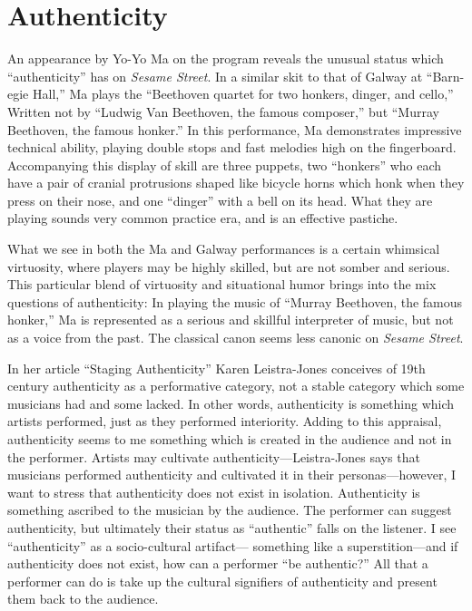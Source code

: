 \documentclass[12pt,letterpaper]{article}
\begin{document}
	\section*{Authenticity}

	An appearance by Yo-Yo Ma on the program reveals the unusual status 
	which ``authenticity'' has on \textit{Sesame Street}. In a similar 
	skit to that of Galway at ``Barn-egie Hall,'' Ma plays the 
	``Beethoven quartet for two honkers, dinger, and cello,'' Written not 
	by ``Ludwig Van Beethoven, the famous composer,'' but ``Murray 
	Beethoven, the famous honker.''\autocite{MaHonkers} In this performance,
	Ma demonstrates impressive technical ability, playing double stops and 
	fast melodies high on the fingerboard. Accompanying this display of 
	skill are three puppets, two ``honkers'' who each have a pair of cranial
	protrusions shaped like bicycle horns which honk when they press on 
	their nose, and one ``dinger'' with a bell on its head. What they are 
	playing sounds very common practice era, and is an effective pastiche.

        What we see in both the Ma and Galway performances is a certain 
	whimsical virtuosity, where players may be highly skilled, but are not
	somber and serious. This particular blend of virtuosity and situational
	humor brings into the mix questions of authenticity: In playing the
	music of ``Murray Beethoven, the famous honker,'' Ma is represented as a
	serious and skillful interpreter of music, but not as a voice from the 
	past. The classical canon seems less canonic on \textit{Sesame Street}.

        In her article ``Staging Authenticity'' Karen Leistra-Jones conceives of
	19th century authenticity as a performative category, not a stable 
	category which some musicians had and some 
	lacked.\autocite[400]{Jones2013} In other words, authenticity is 
	something which artists performed, just as they performed interiority. 
	Adding to this appraisal, authenticity seems to me something which is 
	created in the audience and not in the performer. Artists may cultivate
	authenticity---Leistra-Jones says that musicians performed authenticity
	and cultivated it in their personas---however, I want to stress that 
	authenticity does not exist in isolation. Authenticity is something 
	ascribed to the musician by the audience. The performer can suggest 
	authenticity, but ultimately their status as ``authentic'' falls on the 
	listener. I see ``authenticity'' as a socio-cultural artifact---
	something like a superstition---and if authenticity does not exist, how 
	can a performer ``be authentic?'' All that a performer can do is take 
	up the cultural signifiers of authenticity and present them back to the 
	audience.
\end{document}
